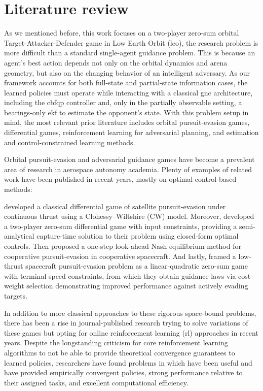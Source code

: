 \chapter{Literature review}
\label{chap:Lit_Review}

As we mentioned before, this work focuses on a two-player zero-sum orbital Target-Attacker-Defender game in Low Earth Orbit (\acs{leo}), the research problem is more difficult than a standard single-agent guidance problem. This is because an agent's best action depends not only on the orbital dynamics and arena geometry, but also on the changing behavior of an intelligent adversary. As our framework accounts for both full-state and partial-state information cases, the learned policies must operate while interacting with a classical \acs{gnc} architecture, including the \acs{cbfqp} controller and, only in the partially observable setting, a bearings-only \acs{ekf} to estimate the opponent's state. With this problem setup in mind, the most relevant prior literature includes orbital pursuit-evasion games, differential games, reinforcement learning for adversarial planning, and estimation and control-constrained learning methods.

Orbital pursuit-evasion and adversarial guidance games have become a prevalent area of research in aerospace autonomy academia. Plenty of examples of related work have been published in recent years, mostly on optimal-control-based methods:

\cite{gong2020continuousthrust}  developed a classical differential game of satellite pursuit-evasion under continuous thrust using a Clohessy--Wiltshire (CW) model. Moreover, \cite{selvakumar2017orbitalplane} developed a two-player zero-sum differential game with input constraints, providing a semi-analytical capture-time solution to their problem using closed-form optimal controls. Then \cite{liu2025multipletoone} proposed a one-step look-ahead Nash equilibrium method for cooperative pursuit-evasion in cooperative spacecraft. And lastly, \cite{drucker2026lowthrustgames} framed a low-thrust spacecraft pursuit-evasion problem as a linear-quadratic zero-sum game with terminal speed constraints, from which they obtain guidance laws via cost-weight selection demonstrating improved performance against actively evading targets.


In addition to more classical approaches to these rigorous space-bound problems, there has been a rise in journal-published research trying to solve variations of these games but opting for online reinforcement learning (\acs{rl}) approaches in recent years. Despite the longstanding criticism for core reinforcement learning algorithms to not be able to provide theoretical convergence guarantees to learned policies, researchers have found problems in which have been useful and have provided empirically convergent policies, strong performance relative to their assigned tasks, and excellent computational efficiency.


